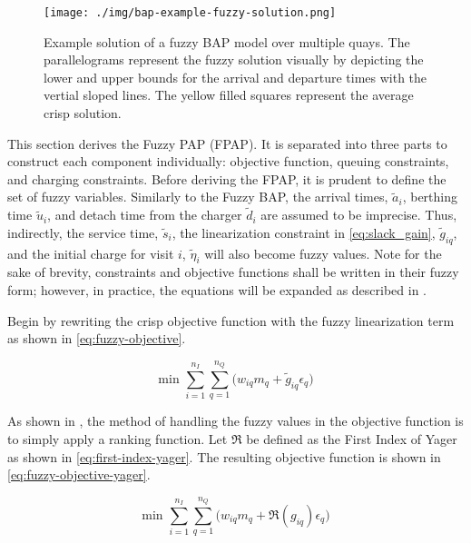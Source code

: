 \documentclass[ee,thesis]{usuthesis}
\begin{document}
\begin{figure}[ht]
\centering
\texttt{[image: ./img/bap-example-fuzzy-solution.png]}
\caption{\label{fig:bap-example-solution}Example solution of a fuzzy BAP model over multiple quays. The parallelograms represent the fuzzy solution visually by depicting the lower and upper bounds for the arrival and departure times with the vertial sloped lines. The yellow filled squares represent the average crisp solution.}
\end{figure}

\label{sec:the-fuzzy-pap}
This section derives the Fuzzy PAP (FPAP). It is separated into three parts to construct each component individually:
objective function, queuing constraints, and charging constraints. Before deriving the FPAP, it is prudent to define the
set of fuzzy variables. Similarly to the Fuzzy BAP, the arrival times, \(\tilde{a}_i\), berthing time \(\tilde{u}_i\), and
detach time from the charger \(\tilde{d}_i\) are assumed to be imprecise. Thus, indirectly, the service time,
\(\tilde{s}_i\), the linearization constraint in \ref{eq:slack_gain}, \(\tilde{g}_{iq}\), and the initial charge for visit
\(i\), \(\tilde{\eta}_i\) will also become fuzzy values. Note for the sake of brevity, constraints and objective functions
shall be written in their fuzzy form; however, in practice, the equations will be expanded as described in
.

\label{sec:fuzzy-objective}
Begin by rewriting the crisp objective function with the fuzzy linearization term as shown in \ref{eq:fuzzy-objective}.

\begin{equation}
\label{eq:fuzzy-objective}
\text{min } \sum_{i=1}^{n_I} \sum_{q=1}^{n_Q} \Big( w_{iq} m_q + \tilde{g}_{iq} \epsilon_{q} \Big)
\end{equation}

As shown in , the method of handling the fuzzy values in the objective function is to
simply apply a ranking function. Let \(\mathfrak{R}\) be defined as the First Index of Yager as shown in \ref{eq:first-index-yager}.
The resulting objective function is shown in \ref{eq:fuzzy-objective-yager}.

\begin{equation}
\label{eq:fuzzy-objective-yager}
\text{min } \sum_{i=1}^{n_I} \sum_{q=1}^{n_Q} \Big( w_{iq} m_q + \mathfrak{R}(g_{iq}) \epsilon_{q} \Big)
\end{equation}
\end{document}
